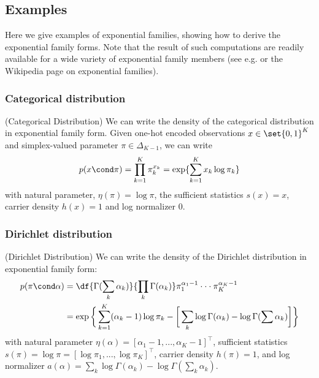 \documentclass{article} %
\newcommand{\logNormalizerFunction}{a}
\newcommand{\sufficientStatsFunction}{s}
\newcommand{\carrierDensity}{h}
\newcommand{\naturalParam}{\eta}
\begin{document}
\subsection{Examples}

Here we give examples of exponential families, showing how to derive the exponential family forms.   Note that the result of such computations are readily available for a wide variety of exponential family members (see e.g. \cite{nielsen2009statistical} or the Wikipedia page on exponential families). 

 
\subsubsection{Categorical distribution}

\begin{example}{(Categorical Distribution)}
\label{ex:categorical_as_ef} We can write the density of the categorical distribution in exponential family form. 	 Given one-hot encoded observations $x \in \set{0,1}^K$ and simplex-valued parameter $\pi \in \Delta_{K-1}$, we can write
\[p(x \cond \pi) = \prod_{k=1}^K \pi_k^{x_k} = \exp \{ \sum_{k=1}^K x_k \log \pi_k\} \]
 with natural parameter, $\naturalParam(\pi) = \log \pi$, the sufficient statistics $\sufficientStatsFunction(x) = x$, carrier density $\carrierDensity(x)=1$ and log normalizer $0$.
\end{example}

\subsubsection{Dirichlet distribution}
\begin{example}{(Dirichlet Distribution)} 
\label{ex:dirichlet_as_ef} We can write the density of the Dirichlet distribution in exponential family form:
\begin{align*}
p (\pi \cond\alpha) &= \df{\Gamma(\sum_k \alpha_k)}{\prod_k \Gamma (\alpha_k) } \pi_1^{\alpha_1 -1} \cdot \cdot \cdot \pi_K^{\alpha_K -1} \\
&= \exp \bigg\{ \sum_{k=1}^K (\alpha_k -1) \log \pi_k - \bigg[ \sum_k \log \Gamma (\alpha_k)-  \log \Gamma (\sum \alpha_k) \bigg]  \bigg\}
\end{align*}
with natural parameter $\naturalParam(\alpha) = [\alpha_1 -1, ..., \alpha_K -1]^\top$, sufficient statistics $\sufficientStatsFunction(\pi) = \log \pi = [\log \pi_1, ..., \log \pi_K]^\top$, carrier density $\carrierDensity(\pi)=1$, and log normalizer $\logNormalizerFunction(\alpha) =  \sum_k \log \Gamma (\alpha_k ) - \log \Gamma (\sum_k \alpha_k)$. 
  
\end{example} 
\end{document}
